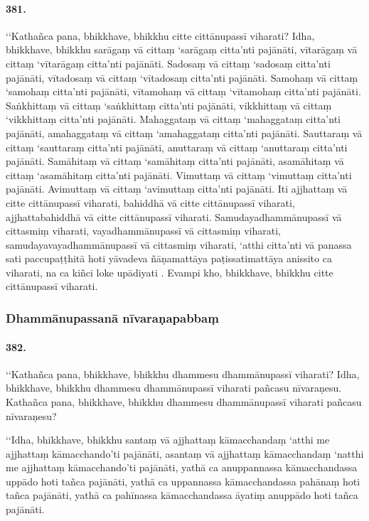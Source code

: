\paragraph{381.} ‘‘Kathañca pana, bhikkhave, bhikkhu citte cittānupassī viharati? Idha, bhikkhave, bhikkhu sarāgaṃ vā cittaṃ ‘sarāgaṃ citta’nti pajānāti, vītarāgaṃ vā cittaṃ ‘vītarāgaṃ citta’nti pajānāti. Sadosaṃ vā cittaṃ ‘sadosaṃ citta’nti pajānāti, vītadosaṃ vā cittaṃ ‘vītadosaṃ citta’nti pajānāti. Samohaṃ vā cittaṃ ‘samohaṃ citta’nti pajānāti, vītamohaṃ vā cittaṃ ‘vītamohaṃ citta’nti pajānāti. Saṅkhittaṃ vā cittaṃ ‘saṅkhittaṃ citta’nti pajānāti, vikkhittaṃ vā cittaṃ ‘vikkhittaṃ citta’nti pajānāti. Mahaggataṃ vā cittaṃ ‘mahaggataṃ citta’nti pajānāti, amahaggataṃ vā cittaṃ ‘amahaggataṃ citta’nti pajānāti. Sauttaraṃ vā cittaṃ ‘sauttaraṃ citta’nti pajānāti, anuttaraṃ vā cittaṃ ‘anuttaraṃ citta’nti pajānāti. Samāhitaṃ vā cittaṃ ‘samāhitaṃ citta’nti pajānāti, asamāhitaṃ vā cittaṃ ‘asamāhitaṃ citta’nti pajānāti. Vimuttaṃ vā cittaṃ ‘vimuttaṃ citta’nti pajānāti. Avimuttaṃ vā cittaṃ ‘avimuttaṃ citta’nti pajānāti. Iti ajjhattaṃ vā citte cittānupassī viharati, bahiddhā vā citte cittānupassī viharati, ajjhattabahiddhā vā citte cittānupassī viharati. Samudayadhammānupassī vā cittasmiṃ viharati, vayadhammānupassī vā cittasmiṃ viharati, samudayavayadhammānupassī vā cittasmiṃ viharati, ‘atthi citta’nti vā panassa sati paccupaṭṭhitā hoti yāvadeva ñāṇamattāya paṭissatimattāya anissito ca viharati, na ca kiñci loke upādiyati . Evampi kho, bhikkhave, bhikkhu citte cittānupassī viharati.


\subsubsection{Dhammānupassanā nīvaraṇapabbaṃ}

\paragraph{382.} ‘‘Kathañca pana, bhikkhave, bhikkhu dhammesu dhammānupassī viharati? Idha, bhikkhave, bhikkhu dhammesu dhammānupassī viharati pañcasu nīvaraṇesu. Kathañca pana, bhikkhave, bhikkhu dhammesu dhammānupassī viharati pañcasu nīvaraṇesu?

‘‘Idha, bhikkhave, bhikkhu santaṃ vā ajjhattaṃ kāmacchandaṃ ‘atthi me ajjhattaṃ kāmacchando’ti pajānāti, asantaṃ vā ajjhattaṃ kāmacchandaṃ ‘natthi me ajjhattaṃ kāmacchando’ti pajānāti, yathā ca anuppannassa kāmacchandassa uppādo hoti tañca pajānāti, yathā ca uppannassa kāmacchandassa pahānaṃ hoti tañca pajānāti, yathā ca pahīnassa kāmacchandassa āyatiṃ anuppādo hoti tañca pajānāti.

